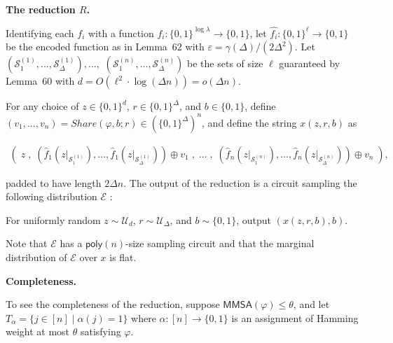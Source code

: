 \documentclass[10pt,a4paper]{article}
\begin{document}
\par\medskip\noindent\textbf{The reduction $R$.}\par




Identifying each $f_{i}$ with a function $f_{i}:\{0,1\}^{\log\lambda}\to\{0,1\}$, let $\hat{f_{i}}:\{0,1\}^{\ell}\to\{0,1\}$ be the encoded function as in Lemma 62 with $\varepsilon=\gamma(\Delta)/(2\Delta^{2})$. Let $\left(\mathcal{S}^{(1)}_{1},...,\mathcal{S}^{(1)}_{\Delta}\right),...,$ $\left(\mathcal{S}^{(n)}_{1},...,\mathcal{S}^{(n)}_{\Delta}\right)$ be the sets of size $\ell$ guaranteed by Lemma 60 with $d=O(\ell^{2}\cdot\log(\Delta n))=o(\Delta n)$.\par




For any choice of $z\in\{0,1\}^{d}$, $r\in\{0,1\}^{\Delta}$, and $b\in\{0,1\}$, define $(v_{1},...,v_{n})=Share(\varphi,b;r)\in(\{0,1\}^{\Delta})^{n}$, and define the string $x(z,r,b)$ as\par


\[\begin{gathered}
\left(\;z\;,\;\left(\hat{f}_{1}\left(z|_{\mathcal{S}^{(1)}_{1}}\right),...,\hat{f}_{1}\left(z|_{\mathcal{S}^{(1)}_{\Delta}}\right)\right)\oplus v_{1}\;,\;...\;,\;\left(\hat{f}_{n}\left(z|_{\mathcal{S}^{(n)}_{1}}\right),...,\hat{f}_{n}\left(z|_{\mathcal{S}^{(n)}_{\Delta}}\right)\right)\oplus v_{n}\;\right),
\end{gathered}\]


padded to have length $2\Delta n$. The output of the reduction is a circuit sampling the following distribution $\mathcal{E}$ :\par



For uniformly random $z\sim\mathcal{U}_{d}$, $r\sim\mathcal{U}_{\Delta}$, and $b\sim\{0,1\}$, output $(x(z,r,b),b)$.\par



Note that $\mathcal{E}$ has a ${\mathsf{poly}}(n)$-size sampling circuit and that the marginal distribution of $\mathcal{E}$ over $x$ is flat.\par





\par\medskip\noindent\textbf{Completeness.}\par




To see the completeness of the reduction, suppose ${\mathsf{MMSA}}(\varphi)\leq\theta$, and let $T_{\alpha}=\{j\in[n]\mid\alpha(j)=1\}$ where $\alpha:[n]\to\{0,1\}$ is an assignment of Hamming weight at most $\theta$ satisfying $\varphi$.\par
\end{document}
